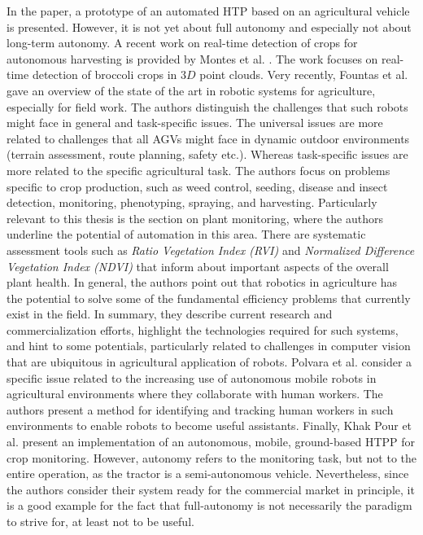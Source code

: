 \documentclass[english, master, utf8]{base/thesis_KBS}
\begin{document}
In the paper, a prototype of an automated HTP based on an agricultural vehicle is presented. However, it is not yet about full autonomy and especially not about long-term autonomy.
\newline
A recent work on real-time detection of crops for autonomous harvesting is provided by Montes et al. \cite{Montes:2020}. The work focuses on real-time detection of broccoli crops
in $3D$ point clouds.\newline
Very recently, Fountas et al. \cite{Fountas:2020} gave an overview of the state of the art in robotic systems for agriculture, especially for field work. The authors distinguish
the challenges that such robots might face in general and task-specific issues. The universal issues are more related to challenges that all AGVs might face in dynamic outdoor
environments (terrain assessment, route planning, safety etc.). \cite{Fountas:2020} Whereas task-specific issues are more related to the specific agricultural task. The authors
focus on problems specific to crop production, such as weed control, seeding, disease and insect detection, monitoring, phenotyping, spraying, and harvesting. Particularly relevant
to this thesis is the section on plant monitoring, where the authors underline the potential of automation in this area. There are systematic assessment tools such as
\textit{Ratio Vegetation Index (RVI)} and \textit{Normalized Difference Vegetation Index (NDVI)} that inform about important aspects of the overall plant health. \cite{Fountas:2020}
In general, the authors point out that robotics in agriculture has the potential to solve some of the fundamental efficiency problems that currently exist in the field. In summary,
they describe current research and commercialization efforts, highlight the technologies required for such systems, and hint to some potentials, particularly related to challenges
in computer vision that are ubiquitous in agricultural application of robots.\newline
Polvara et al. \cite{Polvara:2021} consider a specific issue related to the increasing use of autonomous mobile robots in agricultural environments where they collaborate with
human workers. The authors present a method for identifying and tracking human workers in such environments to enable robots to become useful assistants.\newline
Finally, Khak Pour et al. \cite{KhakPour:2021} present an implementation of an autonomous, mobile, ground-based HTPP for crop monitoring. However, autonomy refers to the
monitoring task, but not to the entire operation, as the tractor is a semi-autonomous vehicle. Nevertheless, since the authors consider their system ready for the commercial
market in principle, it is a good example for the fact that full-autonomy is not necessarily the paradigm to strive for, at least not to be useful.\newline
\end{document}
